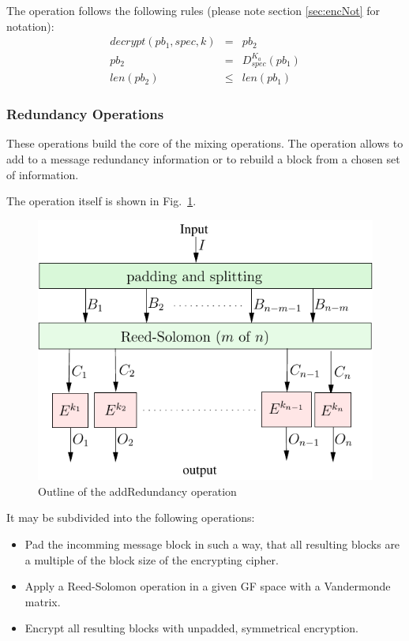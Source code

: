 \documentclass[10pt,journal,compsoc]{IEEEtran}
\let\MYoriglatexcaption\caption
\renewcommand{\caption}[2][\relax]{\MYoriglatexcaption[#2]{#2}}
\begin{document}
The operation follows the following rules (please note section \ref{sec:encNot} for notation):
\begin{eqnarray}
decrypt(pb_1, spec, k) & = & pb_2 \\
pb_2 & = & D_{spec}^{K_a}\left( pb_1 \right)\\
len(pb_2) & \leq & len(pb_1)
\end{eqnarray}

\subsubsection{Redundancy Operations}
These operations build the core of the mixing operations. The operation allows to add to a message redundancy information or to rebuild a block from a chosen set of information. 

The operation itself is shown in Fig.~\ref{fig:addRedundancyOperation}. 
\begin{figure}[ht]\centering
	\includegraphics[width=0.8\columnwidth]{../../inc/addRedundancyOp}
	\caption{Outline of the addRedundancy operation}
	\label{fig:addRedundancyOperation}
\end{figure}

It may be subdivided into the following operations:
\begin{itemize}
	\item Pad the incomming message block in such a way, that all resulting blocks are a multiple of the block size of the encrypting cipher.
	\item Apply a Reed-Solomon operation in a given GF space with a Vandermonde matrix.
	\item Encrypt all resulting blocks with unpadded, symmetrical encryption.
\end{itemize}
\end{document}
